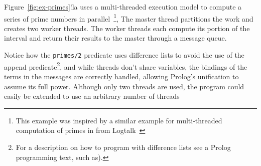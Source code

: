 Figure~\ref{fig:ex-primes}!la
 uses a multi-threaded execution model to
compute a series of prime numbers in parallel~\footnote{This example
  was inspired by a similar example for multi-threaded computation of
  primes in from Logtalk~\cite{log-man}}, The master thread partitions
the work and creates two worker threads.  The worker threads each
compute its portion of the interval and return their results to the
master through a message queue.

Notice how the \texttt{primes/2} predicate uses difference lists to
avoid the use of the append predicate\footnote{For a description on
  how to program with difference lists see a Prolog programming text,
  such as\cite{StSh86}).}, and while threads don't share variables,
the bindings of the terms in the messages are correctly handled,
allowing Prolog's unification to assume its full power.  Although only
two threads are used, the program could easily be extended to use an
arbitrary number of threads

